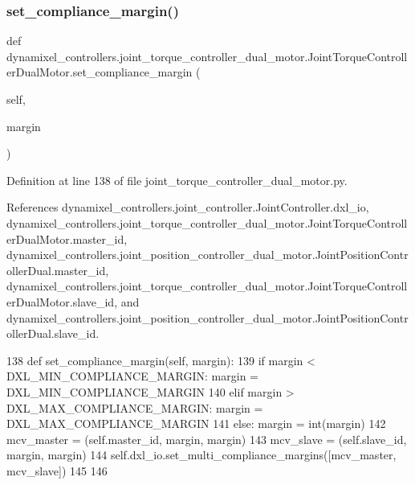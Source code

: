 \subsubsection{\texorpdfstring{set\+\_\+compliance\+\_\+margin()}{set\_compliance\_margin()}}
{\footnotesize\ttfamily def dynamixel\+\_\+controllers.\+joint\+\_\+torque\+\_\+controller\+\_\+dual\+\_\+motor.\+Joint\+Torque\+Controller\+Dual\+Motor.\+set\+\_\+compliance\+\_\+margin (\begin{DoxyParamCaption}\item[{}]{self,  }\item[{}]{margin }\end{DoxyParamCaption})}



Definition at line 138 of file joint\+\_\+torque\+\_\+controller\+\_\+dual\+\_\+motor.\+py.



References dynamixel\+\_\+controllers.\+joint\+\_\+controller.\+Joint\+Controller.\+dxl\+\_\+io, dynamixel\+\_\+controllers.\+joint\+\_\+torque\+\_\+controller\+\_\+dual\+\_\+motor.\+Joint\+Torque\+Controller\+Dual\+Motor.\+master\+\_\+id, dynamixel\+\_\+controllers.\+joint\+\_\+position\+\_\+controller\+\_\+dual\+\_\+motor.\+Joint\+Position\+Controller\+Dual.\+master\+\_\+id, dynamixel\+\_\+controllers.\+joint\+\_\+torque\+\_\+controller\+\_\+dual\+\_\+motor.\+Joint\+Torque\+Controller\+Dual\+Motor.\+slave\+\_\+id, and dynamixel\+\_\+controllers.\+joint\+\_\+position\+\_\+controller\+\_\+dual\+\_\+motor.\+Joint\+Position\+Controller\+Dual.\+slave\+\_\+id.


\begin{DoxyCode}
138     \textcolor{keyword}{def }set\_compliance\_margin(self, margin):
139         \textcolor{keywordflow}{if} margin < DXL\_MIN\_COMPLIANCE\_MARGIN: margin = DXL\_MIN\_COMPLIANCE\_MARGIN
140         \textcolor{keywordflow}{elif} margin > DXL\_MAX\_COMPLIANCE\_MARGIN: margin = DXL\_MAX\_COMPLIANCE\_MARGIN
141         \textcolor{keywordflow}{else}: margin = int(margin)
142         mcv\_master = (self.master\_id, margin, margin)
143         mcv\_slave = (self.slave\_id, margin, margin)
144         self.dxl\_io.set\_multi\_compliance\_margins([mcv\_master, mcv\_slave])
145 
146 
\end{DoxyCode}
\mbox{\label{classdynamixel__controllers_1_1joint__torque__controller__dual__motor_1_1_joint_torque_controller_dual_motor_afa78a656fb1a9e5f1b08f3d033de245c}} 
